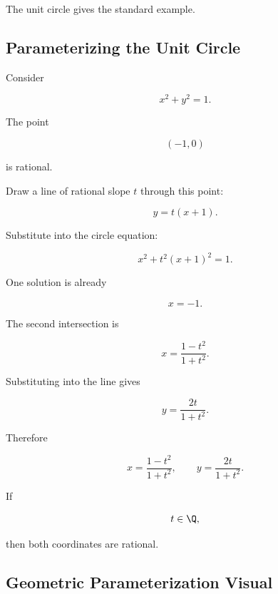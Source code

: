The unit circle gives the standard example.

\subsection{Parameterizing the Unit Circle}
\label{subsec:parameterizing-unit-circle}

Consider

\[ x^2+y^2=1. \]

The point

\[ (-1,0) \]

is rational.

Draw a line of rational slope \(t\) through this point:

\[ y=t(x+1). \]

Substitute into the circle equation:

\[ x^2+t^2(x+1)^2=1. \]

One solution is already

\[ x=-1. \]

The second intersection is

\[ x=\frac{1-t^2}{1+t^2}. \]

Substituting into the line gives

\[ y=\frac{2t}{1+t^2}. \]

Therefore

\[
\boxed{
x=\frac{1-t^2}{1+t^2},
\qquad
y=\frac{2t}{1+t^2}.
}
\]

If

\[ t\in\Q, \]

then both coordinates are rational.

\subsection{Geometric Parameterization Visual}
\label{subsec:circle-parameterization-visual}

\begin{centereddiagram}
\end{centereddiagram}

